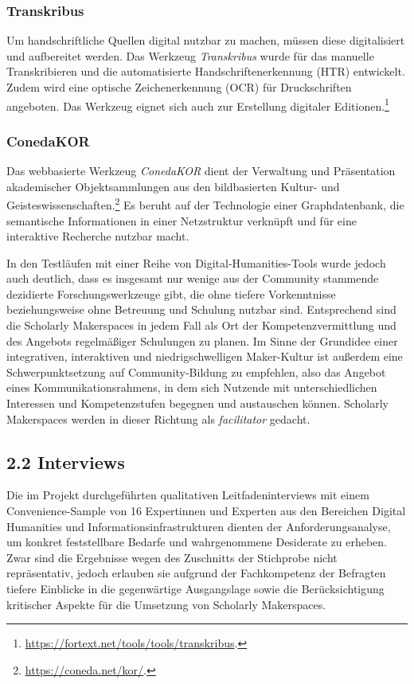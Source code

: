 \documentclass[a4paper,
fontsize=11pt,
oneside,
numbers=noperiodatend,
parskip=half-,
bibliography=totoc,
final
]{scrartcl}
\begin{document}
\hypertarget{transkribus}{%
\subsubsection{Transkribus}\label{transkribus}}

Um handschriftliche Quellen digital nutzbar zu machen, müssen diese
digitalisiert und aufbereitet werden. Das Werkzeug \emph{Transkribus}
wurde für das manuelle Transkribieren und die automatisierte
Handschriftenerkennung (HTR) entwickelt. Zudem wird eine optische
Zeichenerkennung (OCR) für Druckschriften angeboten. Das Werkzeug eignet
sich auch zur Erstellung digitaler Editionen.\footnote{\url{https://fortext.net/tools/tools/transkribus}.}

\hypertarget{conedakor}{%
\subsubsection{ConedaKOR}\label{conedakor}}

Das webbasierte Werkzeug \emph{ConedaKOR} dient der Verwaltung und
Präsentation akademischer Objektsammlungen aus den bildbasierten Kultur-
und Geisteswissenschaften.\footnote{\url{https://coneda.net/kor/}.} Es
beruht auf der Technologie einer Graphdatenbank, die semantische
Informationen in einer Netzstruktur verknüpft und für eine interaktive
Recherche nutzbar macht.

In den Testläufen mit einer Reihe von Digital-Humanities-Tools wurde
jedoch auch deutlich, dass es insgesamt nur wenige aus der Community
stammende dezidierte Forschungswerkzeuge gibt, die ohne tiefere
Vorkenntnisse beziehungsweise ohne Betreuung und Schulung nutzbar sind.
Entsprechend sind die Scholarly Makerspaces in jedem Fall als Ort der
Kompetenzvermittlung und des Angebots regelmäßiger Schulungen zu planen.
Im Sinne der Grundidee einer integrativen, interaktiven und
niedrigschwelligen Maker-Kultur ist außerdem eine Schwerpunktsetzung auf
Community-Bildung zu empfehlen, also das Angebot eines
Kommunikationsrahmens, in dem sich Nutzende mit unterschiedlichen
Interessen und Kompetenzstufen begegnen und austauschen können.
Scholarly Makerspaces werden in dieser Richtung als \emph{facilitator}
gedacht.

\hypertarget{interviews}{%
\subsection{2.2 Interviews}\label{interviews}}

Die im Projekt durchgeführten qualitativen Leitfadeninterviews mit einem
Convenience-Sample von 16 Expertinnen und Experten aus den Bereichen
Digital Humanities und Informationsinfrastrukturen dienten der
Anforderungsanalyse, um konkret feststellbare Bedarfe und wahrgenommene
Desiderate zu erheben. Zwar sind die Ergebnisse wegen des Zuschnitts der
Stichprobe nicht repräsentativ, jedoch erlauben sie aufgrund der
Fachkompetenz der Befragten tiefere Einblicke in die gegenwärtige
Ausgangslage sowie die Berücksichtigung kritischer Aspekte für die
Umsetzung von Scholarly Makerspaces.
\end{document}

